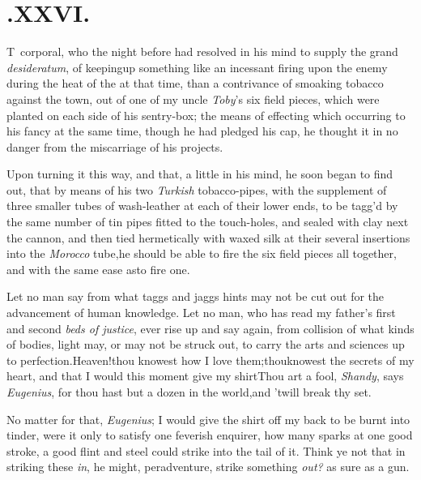 \documentclass{article}
\begin{document}
\section{.\enspace XXVI.}

\lettrine{T}{\,} corporal, who the night before
had resolved in his mind to
supply the grand \textit{desideratum}, of keeping\break up something like an incessant
firing upon the enemy during the heat of the  at that time, than a contrivance of smoaking tobacco against the town, out of
one of my uncle \textit{Toby}’s six field pieces, which were planted on each side of
his sentry-box; the means of effecting which occurring to his fancy at the same
time, though he had pledged his cap, he thought it in no danger from the miscarriage
of his projects.

Upon turning it this way, and that, a little in his mind, he
soon began to find out, that by means of his two \textit{Turkish}
tobacco-pipes, with the supplement of three smaller tubes of
wash-leather at each of their lower ends, to be tagg’d by the
same number of tin pipes fitted to the touch-holes, and sealed with
clay next the cannon, and then tied hermetically with waxed silk at
their several insertions into the \textit{Morocco} tube,\tsk he
should be able to fire the six field pieces all together, and with
the same ease as\break to fire one.\tsh 

\enlargethispage{2\baselineskip}
\tsh Let no man say from what taggs and jaggs hints may
not be cut out for the advancement of human knowledge. Let no man, who
has read my father’s first and second \textit{beds of justice},
ever rise up and say again, from collision of what kinds of bodies,
light may, or may not be struck out, to carry the arts and sciences
up to perfection.\tsh Heaven!\break thou knowest how I love
them;\tsk thou\break knowest the secrets of my heart, and that I
would this moment give my shirt\break\tsh Thou art a fool,
\textit{Shandy}, says \textit{Eu\-genius}, for thou hast but a dozen in
the world,\tsk and ’twill break thy set.\tsh

No matter for that, \textit{Eugenius}; I would give the shirt off
my back to be burnt into tinder, were it only to satisfy one
feverish enquirer, how many sparks at one good stroke, a good flint
and steel could strike into the tail of it.\tsh\break
Think ye not that in striking these \textit{in},\tsk\break
he might, peradventure, strike something \textit{out?} as sure as a
gun.\tsh
\end{document}
